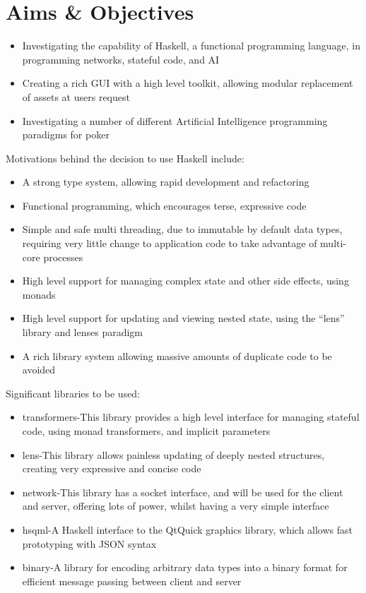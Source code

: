 \section{Aims \& Objectives}

\begin{itemize}
\item Investigating the capability of Haskell, a functional programming language, in programming networks, stateful code, and AI
\item Creating a rich GUI with a high level toolkit, allowing modular replacement of assets at users request
\item Investigating a number of different Artificial Intelligence programming paradigms for poker
\end{itemize}
Motivations behind the decision to use Haskell include:
\begin{itemize}
\item A strong type system, allowing rapid development and refactoring
\item Functional programming, which encourages terse, expressive code
\item Simple and safe multi threading, due to immutable by default data types, requiring very little change to application code to take advantage of multi-core processes
\item High level support for managing complex state and other side effects, using monads\cite{benton2000}
\item High level support for updating and viewing nested state, using the ``lens'' library and lenses paradigm\cite{bohannon2006}
\item A rich library system allowing massive amounts of duplicate code to be avoided
\end{itemize}
Significant libraries to be used:
\begin{itemize}
\item transformers-This library provides a high level interface for managing stateful code, using monad transformers, and implicit parameters
\item lens-This library allows painless updating of deeply nested structures, creating very expressive and concise code
\item network-This library has a socket interface, and will be used for the client and server, offering lots of power, whilst having a very simple interface
\item hsqml-A Haskell interface to the QtQuick graphics library, which allows fast prototyping with JSON syntax
\item binary-A library for encoding arbitrary data types into a binary format for efficient message passing between client and server
\end{itemize}
